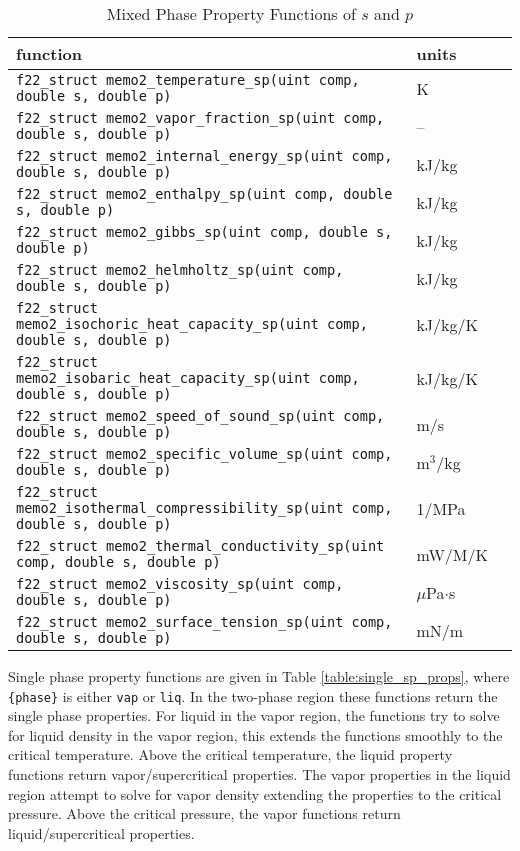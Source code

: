 \documentclass[oneside]{book}
\begin{document}
\begin{table}[h!]
\centering
\caption{Mixed Phase Property Functions of $s$ and $p$}
\begin{tabular}{ l l l }
\hline
function & units \\
\hline
\hline
\texttt{f22\_struct memo2\_temperature\_sp(uint comp, double s, double p)} & K  \\ [1ex]
\texttt{f22\_struct memo2\_vapor\_fraction\_sp(uint comp, double s, double p)} & -- \\ [1ex]
\texttt{f22\_struct memo2\_internal\_energy\_sp(uint comp, double s, double p)} &  kJ/kg \\ [1ex]
\texttt{f22\_struct memo2\_enthalpy\_sp(uint comp, double s, double p)} &  kJ/kg \\ [1ex]
\texttt{f22\_struct memo2\_gibbs\_sp(uint comp, double s, double p)} &  kJ/kg \\ [1ex]
\texttt{f22\_struct memo2\_helmholtz\_sp(uint comp, double s, double p)} &  kJ/kg \\ [1ex]
\texttt{f22\_struct memo2\_isochoric\_heat\_capacity\_sp(uint comp, double s, double p)} &  kJ/kg/K \\ [1ex]
\texttt{f22\_struct memo2\_isobaric\_heat\_capacity\_sp(uint comp, double s, double p)} &  kJ/kg/K \\ [1ex]
\texttt{f22\_struct memo2\_speed\_of\_sound\_sp(uint comp, double s, double p)} &  m/s \\ [1ex]
\texttt{f22\_struct memo2\_specific\_volume\_sp(uint comp, double s, double p)} &  m$^3$/kg \\ [1ex]
\texttt{f22\_struct memo2\_isothermal\_compressibility\_sp(uint comp, double s, double p)} &  1/MPa \\ [1ex]
\texttt{f22\_struct memo2\_thermal\_conductivity\_sp(uint comp, double s, double p)} &  mW/M/K \\ [1ex]
\texttt{f22\_struct memo2\_viscosity\_sp(uint comp, double s, double p)} &  $\mu$Pa$\cdot$s \\ [1ex]
\texttt{f22\_struct memo2\_surface\_tension\_sp(uint comp, double s, double p)} &  mN/m \\ [1ex]
\hline    
\end{tabular}
\label{table:mix_sp_props}
\end{table}

Single phase property functions are given in Table \ref{table:single_sp_props}, where \texttt{\{phase\}} is either \texttt{vap} or \texttt{liq}. In the two-phase region these functions return the single phase properties. For liquid in the vapor region, the functions try to solve for liquid density in the vapor region, this extends the functions smoothly to the critical temperature.  Above the critical temperature, the liquid property functions return vapor/supercritical properties. The vapor properties in the liquid region attempt to solve for vapor density extending the properties to the critical pressure. Above the critical pressure, the vapor functions return liquid/supercritical properties.
\end{document}

